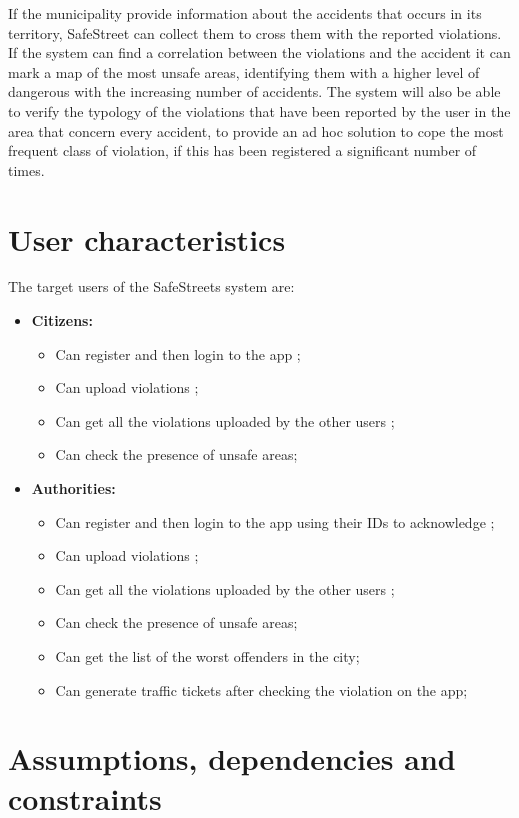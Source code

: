 \documentclass[a4paper, hidelinks, 12pt]{report}
\begin{document}
    If the municipality provide information about the accidents that occurs in its territory, SafeStreet can collect them to cross them with the reported violations. If the system can find a correlation between the violations and the accident it can mark a map of the most unsafe areas, identifying them with a higher level of dangerous with the increasing number of accidents. The system will also be able to verify the typology of the violations that have been reported by the user in the area that concern every accident, to provide an ad hoc solution to cope the most frequent class of violation, if this has been registered a significant number of times.
    \section{User characteristics}\label{sec:user-characteristics}
    The target users of the SafeStreets system are:
    \begin{itemize}
        \item \textbf{Citizens:}
        \begin{itemize}
            \item Can register and then login to the app ;
            \item Can upload violations ;
            \item Can get all the violations uploaded by the other users ;
            \item Can check the presence of unsafe areas;
        \end{itemize}
        \item \textbf{Authorities:}
        \begin{itemize}
            \item Can register and then login to the app using their IDs to acknowledge  ;
            \item Can upload violations ;
            \item Can get all the violations uploaded by the other users ;
            \item Can check the presence of unsafe areas;
            \item Can get the list of the worst offenders in the city;
            \item Can generate traffic tickets after checking the violation on the app;
        \end{itemize}
    \end{itemize}
    \section{Assumptions, dependencies and constraints}\label{sec:assumptions,-dependencies-and-constraints}
\end{document}
